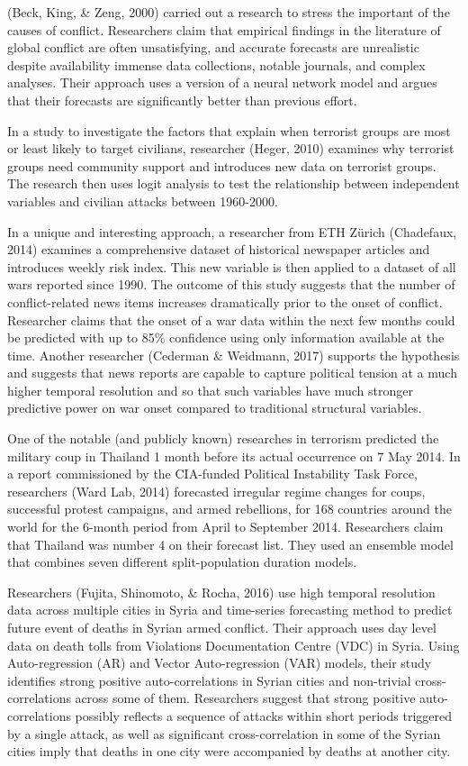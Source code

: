 \documentclass[11pt,oneside,a4paper]{reedthesis}
\begin{document}
(Beck, King, \& Zeng, 2000) carried out a research to stress the
important of the causes of conflict. Researchers claim that empirical
findings in the literature of global conflict are often unsatisfying,
and accurate forecasts are unrealistic despite availability immense data
collections, notable journals, and complex analyses. Their approach uses
a version of a neural network model and argues that their forecasts are
significantly better than previous effort.

In a study to investigate the factors that explain when terrorist groups
are most or least likely to target civilians, researcher (Heger, 2010)
examines why terrorist groups need community support and introduces new
data on terrorist groups. The research then uses logit analysis to test
the relationship between independent variables and civilian attacks
between 1960-2000.

In a unique and interesting approach, a researcher from ETH Zürich
(Chadefaux, 2014) examines a comprehensive dataset of historical
newspaper articles and introduces weekly risk index. This new variable
is then applied to a dataset of all wars reported since 1990. The
outcome of this study suggests that the number of conflict-related news
items increases dramatically prior to the onset of conflict. Researcher
claims that the onset of a war data within the next few months could be
predicted with up to 85\% confidence using only information available at
the time. Another researcher (Cederman \& Weidmann, 2017) supports the
hypothesis and suggests that news reports are capable to capture
political tension at a much higher temporal resolution and so that such
variables have much stronger predictive power on war onset compared to
traditional structural variables.

One of the notable (and publicly known) researches in terrorism
predicted the military coup in Thailand 1 month before its actual
occurrence on 7 May 2014. In a report commissioned by the CIA-funded
Political Instability Task Force, researchers (Ward Lab, 2014)
forecasted irregular regime changes for coups, successful protest
campaigns, and armed rebellions, for 168 countries around the world for
the 6-month period from April to September 2014. Researchers claim that
Thailand was number 4 on their forecast list. They used an ensemble
model that combines seven different split-population duration models.

Researchers (Fujita, Shinomoto, \& Rocha, 2016) use high temporal
resolution data across multiple cities in Syria and time-series
forecasting method to predict future event of deaths in Syrian armed
conflict. Their approach uses day level data on death tolls from
Violations Documentation Centre (VDC) in Syria. Using Auto-regression
(AR) and Vector Auto-regression (VAR) models, their study identifies
strong positive auto-correlations in Syrian cities and non-trivial
cross-correlations across some of them. Researchers suggest that strong
positive auto-correlations possibly reflects a sequence of attacks
within short periods triggered by a single attack, as well as
significant cross-correlation in some of the Syrian cities imply that
deaths in one city were accompanied by deaths at another city.
\end{document}
